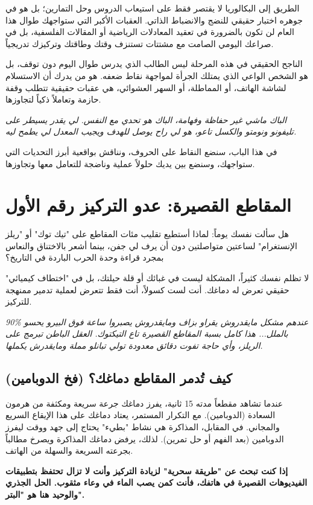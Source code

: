 \documentclass[12pt,a4paper]{book}
\newcommand{\quoteAr}[1]{%
	\begin{myquote}
		\itshape #1
	\end{myquote}
}
\newcommand{\importantAr}[1]{%
	\begin{important}
		\bfseries #1
	\end{important}
}
\begin{document}
	الطريق إلى البكالوريا لا يقتصر فقط على استيعاب الدروس وحل التمارين؛ بل هو في جوهره اختبار حقيقي للنضج والانضباط الذاتي. العقبات الأكبر التي ستواجهك طوال هذا العام لن تكون بالضرورة في تعقيد المعادلات الرياضية أو المقالات الفلسفية، بل في صراعك اليومي الصامت مع مشتتات تستنزف وقتك وطاقتك وتركيزك تدريجياً.
	
	الناجح الحقيقي في هذه المرحلة ليس الطالب الذي يدرس طوال اليوم دون توقف، بل هو الشخص الواعي الذي يمتلك الجرأة لمواجهة نقاط ضعفه. هو من يدرك أن الاستسلام لشاشة الهاتف، أو المماطلة، أو السهر العشوائي، هي عقبات حقيقية تتطلب وقفة حازمة وتعاملاً ذكياً لتجاوزها.
	
	\quoteAr{الباك ماشي غير حفاظة وفهامة، الباك هو تحدي مع النفس. لي يقدر يسيطر على تليفونو ونومتو والكسل تاعو، هو لي راح يوصل للهدف ويجيب المعدل لي يطمح ليه.}
	
	في هذا الباب، سنضع النقاط على الحروف، ونناقش بواقعية أبرز التحديات التي ستواجهك، وسنضع بين يديك حلولاً عملية وناضجة للتعامل معها وتجاوزها.
	
	
	\section{المقاطع القصيرة: عدو التركيز رقم الأول}
	
	هل سألت نفسك يوماً: لماذا أستطيع تقليب مئات المقاطع على "تيك توك" أو "ريلز الإنستغرام" لساعتين متواصلتين دون أن يرف لي جفن، بينما أشعر بالاختناق والنعاس بمجرد قراءة وحدة الحرب الباردة في التاريخ؟ 
	
	لا تظلم نفسك كثيراً، المشكلة ليست في غبائك أو قلة حيلتك، بل في "اختطاف كيميائي" حقيقي تعرض له دماغك. أنت لست كسولاً، أنت فقط تتعرض لعملية تدمير ممنهجة للتركيز.
	
	\quoteAr{90\% عندهم مشكل مايقدروش يقراو بزاف ومايقدروش يصبروا ساعة فوق البيرو يحسو بالملل... هذا كامل بسبة المقاطع القصيرة تاع التيكتوك. العقل الباطن تبرمج على الريلز، وأي حاجة تفوت دقائق معدودة تولي تبانلو مملة ومايقدرش يكملها.}
	
	\subsection*{كيف تُدمر المقاطع دماغك؟ (فخ الدوبامين)}
	عندما تشاهد مقطعاً مدته 15 ثانية، يفرز دماغك جرعة سريعة ومكثفة من هرمون السعادة (الدوبامين). مع التكرار المستمر، يعتاد دماغك على هذا الإيقاع السريع والمجاني. في المقابل، المذاكرة هي نشاط "بطيء" يحتاج إلى جهد ووقت ليفرز الدوبامين (بعد الفهم أو حل تمرين). لذلك، يرفض دماغك المذاكرة ويصرخ مطالباً بجرعته السريعة والسهلة من الهاتف. 
	
	\importantAr{إذا كنت تبحث عن "طريقة سحرية" لزيادة التركيز وأنت لا تزال تحتفظ بتطبيقات الفيديوهات القصيرة في هاتفك، فأنت كمن يصب الماء في وعاء مثقوب. الحل الجذري والوحيد هنا هو "البتر".}
	
\end{document}
